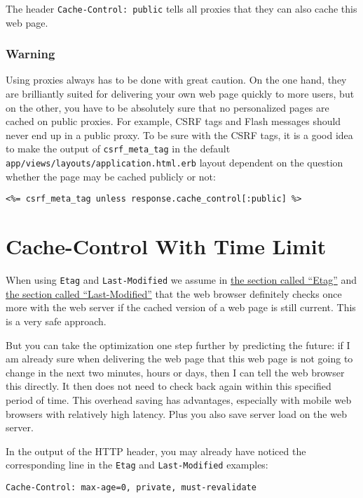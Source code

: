 \documentclass[a4paper]{book}
\newcommand{\chap}[1]{\newpage\thispagestyle{empty}\chapter{#1}\label{chap:\thechapter}}
\begin{document}
The header \texttt{Cache-Control: public} tells all proxies that they can also cache this web page.

\subsection{Warning}\label{warning-14}

Using proxies always has to be done with great caution. On the one hand, they are brilliantly suited for delivering your own web page quickly to more users, but on the other, you have to be absolutely sure that no personalized pages are cached on public proxies. For example, CSRF tags and Flash messages should never end up in a public proxy. To be sure with the CSRF tags, it is a good idea to make the output of \texttt{csrf\_meta\_tag} in the default \texttt{app/views/layouts/application.html.erb} layout dependent on the question whether the page may be cached publicly or not:

\begin{shaded}\begin{verbatim}
<%= csrf_meta_tag unless response.cache_control[:public] %>
\end{verbatim}\end{shaded}

\chap{Cache-Control With Time Limit}\label{cache-control-with-time-limit}

When using \texttt{Etag} and \texttt{Last-Modified} we assume in \hyperref[httpux5fcachingux5fetag]{the section called “Etag”} and \hyperref[httpux5fcachingux5flastux5fmodified]{the section called “Last-Modified”} that the web browser definitely checks once more with the web server if the cached version of a web page is still current. This is a very safe approach.

But you can take the optimization one step further by predicting the future: if I am already sure when delivering the web page that this web page is not going to change in the next two minutes, hours or days, then I can tell the web browser this directly. It then does not need to check back again within this specified period of time. This overhead saving has advantages, especially with mobile web browsers with relatively high latency. Plus you also save server load on the web server.

In the output of the HTTP header, you may already have noticed the corresponding line in the \texttt{Etag} and \texttt{Last-Modified} examples:

\begin{shaded}\begin{verbatim}
Cache-Control: max-age=0, private, must-revalidate
\end{verbatim}\end{shaded}
\end{document}
